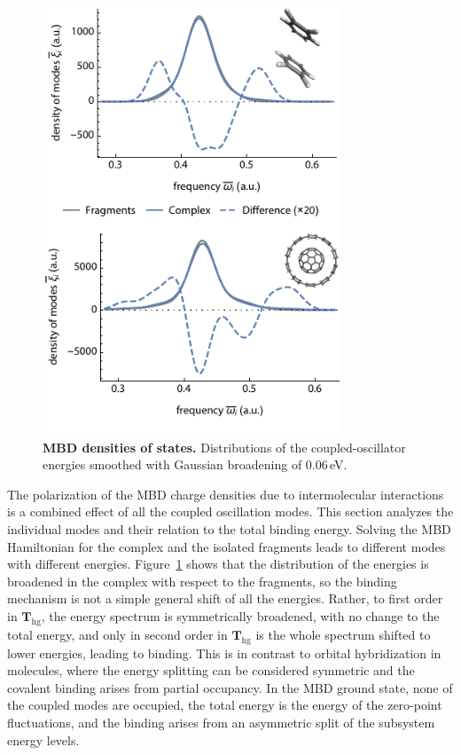 \begin{figure}
\includegraphics[width=3.5in]{media/doses.pdf}
\caption{\textbf{MBD densities of states.}
Distributions of the coupled-oscillator energies smoothed with Gaussian broadening of 0.06\,eV.
}\label{fig:mbd-dos}
\end{figure}

The polarization of the MBD charge densities due to intermolecular interactions is a combined effect of all the coupled oscillation modes.
This section analyzes the individual modes and their relation to the total binding energy.
Solving the MBD Hamiltonian for the complex and the isolated fragments leads to different modes with different energies.
Figure~\ref{fig:mbd-dos} shows that the distribution of the energies is broadened in the complex with respect to the fragments, so the binding mechanism is not a simple general shift of all the energies.
Rather, to first order in $\mathbf T_\text{hg}$, the energy spectrum is symmetrically broadened, with no change to the total energy, and only in second order in $\mathbf T_\text{hg}$ is the whole spectrum shifted to lower energies, leading to binding.
This is in contrast to orbital hybridization in molecules, where the energy splitting can be considered symmetric and the covalent binding arises from partial occupancy.
In the MBD ground state, none of the coupled modes are occupied, the total energy is the energy of the zero-point fluctuations, and the binding arises from an asymmetric split of the subsystem energy levels.

